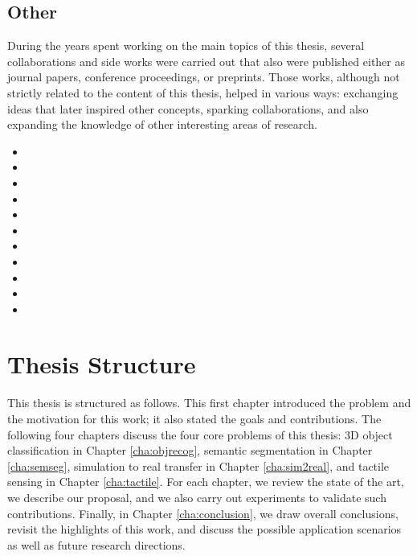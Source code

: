 \subsection{Other}

During the years spent working on the main topics of this thesis, several collaborations and side works were carried out that also were published either as journal papers, conference proceedings, or preprints. Those works, although not strictly related to the content of this thesis, helped in various ways: exchanging ideas that later inspired other concepts, sparking collaborations, and also expanding the knowledge of other interesting areas of research.

\begin{itemize}
  \item {}
  \item {}
  \item {}
  \item {}
  \item {}
  \item {}
  \item {}
  \item {}
  \item {}
  \item {}
  \item {}
\end{itemize}

\section{Thesis Structure}
\label{cha:introduction:sec:structure}

This thesis is structured as follows. This first chapter introduced the problem and the motivation for this work; it also stated the goals and contributions. The following four chapters discuss the four core problems of this thesis: 3D object classification in Chapter \ref{cha:objrecog}, semantic segmentation in Chapter \ref{cha:semseg}, simulation to real transfer in Chapter \ref{cha:sim2real}, and tactile sensing in Chapter \ref{cha:tactile}. For each chapter, we review the state of the art, we describe our proposal, and we also carry out experiments to validate such contributions. Finally, in Chapter \ref{cha:conclusion}, we draw overall conclusions, revisit the highlights of this work, and discuss the possible application scenarios as well as future research directions.